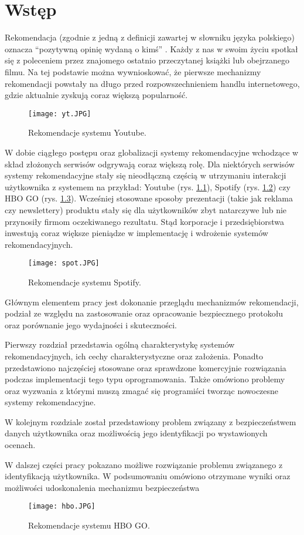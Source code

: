 \chapter{Wstęp}

Rekomendacja (zgodnie z jedną z definicji zawartej w słowniku języka polskiego) oznacza “pozytywną opinię wydaną o kimś” \cite{pwn}. Każdy z nas w swoim życiu spotkał się z poleceniem przez znajomego ostatnio przeczytanej książki lub obejrzanego filmu. Na tej podstawie można wywnioskować, że pierwsze mechanizmy rekomendacji powstały na długo przed rozpowszechnieniem handlu internetowego, gdzie aktualnie zyskują coraz większą popularność.

\begin{figure}
    \centering
    \texttt{[image: yt.JPG]}
    \caption{Rekomendacje systemu Youtube.}
    \label{fig:yt}
\end{figure}

W dobie ciągłego postępu oraz globalizacji systemy rekomendacyjne wchodzące w skład złożonych serwisów odgrywają coraz większą rolę. Dla niektórych serwisów systemy rekomendacyjne stały się nieodłączną częścią w utrzymaniu interakcji użytkownika z systemem na przykład: Youtube (rys. \ref{fig:yt}), Spotify (rys. \ref{fig:spotify}) czy HBO GO (rys. \ref{fig:hbo}). Wcześniej stosowane sposoby prezentacji (takie jak reklama czy newslettery) produktu stały się dla użytkowników zbyt natarczywe lub nie przynosiły firmom oczekiwanego rezultatu. Stąd korporacje i przedsiębiorstwa inwestują coraz większe pieniądze w implementację i wdrożenie systemów rekomendacyjnych.

\begin{figure}
    \centering
    \texttt{[image: spot.JPG]}
    \caption{Rekomendacje systemu Spotify.}
    \label{fig:spotify}
\end{figure}

Głównym elementem pracy jest dokonanie przeglądu mechanizmów rekomendacji, podział ze względu na zastosowanie oraz opracowanie bezpiecznego protokołu oraz porównanie jego wydajności i skuteczności.

Pierwszy rozdział przedstawia ogólną charakterystykę systemów rekomendacyjnych, ich cechy charakterystyczne oraz założenia. Ponadto przedstawiono najczęściej stosowane oraz sprawdzone komercyjnie rozwiązania podczas implementacji tego typu oprogramowania. Także omówiono problemy oraz wyzwania z którymi muszą zmagać się programiści tworząc nowoczesne systemy rekomendacyjne.  

W kolejnym rozdziale został przedstawiony problem związany z bezpieczeństwem danych użytkownika oraz możliwością jego identyfikacji po wystawionych ocenach.

W dalszej części pracy pokazano możliwe rozwiązanie problemu związanego z identyfikacją użytkownika.
W podsumowaniu omówiono otrzymane wyniki oraz możliwości udoskonalenia mechanizmu bezpieczeństwa 

\begin{figure}
    \texttt{[image: hbo.JPG]}
    \caption{Rekomendacje systemu HBO GO.}
    \label{fig:hbo}
\end{figure}
